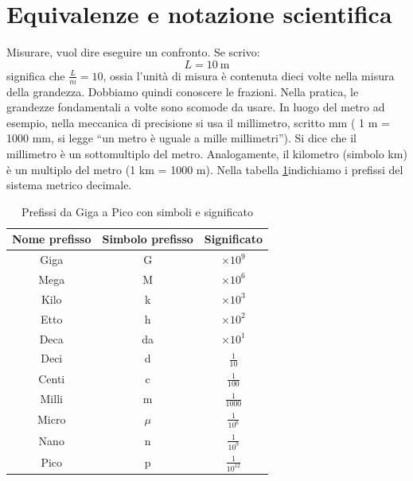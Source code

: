 \section{Equivalenze e notazione scientifica}

Misurare, vuol dire eseguire un confronto. Se scrivo:
\[
L=\SI{10}{\meter}
\]
significa che $\frac{L}{m} = 10$, ossia l'unità di misura è contenuta dieci volte nella misura della grandezza. Dobbiamo quindi conoscere le frazioni. Nella pratica, le grandezze fondamentali a volte sono scomode da usare. In luogo del metro ad esempio, nella meccanica di precisione si usa il millimetro, scritto mm ( 1 m = 1000 mm, si legge ``un metro è uguale a mille millimetri''). Si dice che il millimetro è un sottomultiplo del metro. Analogamente, il kilometro (simbolo km) è un multiplo del metro (1 km = 1000 m). Nella tabella \ref{tab:prefixes}indichiamo i prefissi del sistema metrico decimale. 

\begin{table}[h!]
	\centering
	\begin{tabular}{|c|c|c|}
		\hline
		\textbf{Nome prefisso} & \textbf{Simbolo prefisso} & \textbf{Significato} \\
		\hline
		Giga & G & \( \times 10^9 \) \\
		\hline
		Mega & M & \( \times 10^6 \) \\
		\hline
		Kilo & k & \( \times 10^3 \) \\
		\hline
		Etto & h & \( \times 10^2 \) \\
		\hline
		Deca & da & \( \times 10^1 \) \\
		\hline
		Deci & d & \( \frac{1}{10} \) \\
		\hline
		Centi & c & \( \frac{1}{100} \) \\
		\hline
		Milli & m & \( \frac{1}{1000} \) \\
		\hline
		Micro & \(\mu\) & \( \frac{1}{10^6} \) \\
		\hline
		Nano & n & \( \frac{1}{10^9} \) \\
		\hline
		Pico & p & \( \frac{1}{10^{12}} \) \\
		\hline
	\end{tabular}
	\caption{Prefissi da Giga a Pico con simboli e significato}
	\label{tab:prefixes}
\end{table}

